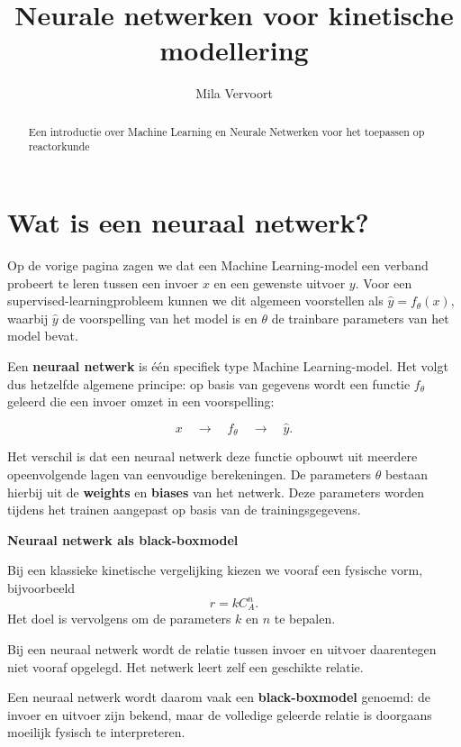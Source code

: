 \documentclass{ximera}
\title{Neurale netwerken voor kinetische modellering}
\author{Mila Vervoort}
\begin{document}
\begin{abstract}
    Een introductie over Machine Learning en Neurale Netwerken voor het toepassen op reactorkunde
\end{abstract}
\maketitle
\label{xim: Neurale Netwerken}

\section*{Wat is een neuraal netwerk?}

Op de vorige pagina zagen we dat een Machine Learning-model een verband probeert te leren tussen een invoer $x$ en een gewenste uitvoer $y$. Voor een supervised-learningprobleem kunnen we dit algemeen voorstellen als $\hat{y}=f_\theta(x),$ waarbij $\hat{y}$ de voorspelling van het model is en $\theta$ de trainbare parameters van het model bevat.

Een \textbf{neuraal netwerk} is één specifiek type Machine Learning-model.
Het volgt dus hetzelfde algemene principe: op basis van gegevens wordt een functie $f_\theta$ geleerd die een invoer omzet in een voorspelling:

\[
x
\quad\longrightarrow\quad
f_\theta
\quad\longrightarrow\quad
\hat{y}.
\]

Het verschil is dat een neuraal netwerk deze functie opbouwt uit meerdere opeenvolgende lagen van eenvoudige berekeningen. De parameters $\theta$ bestaan hierbij uit de \textbf{weights} en \textbf{biases} van het netwerk. Deze parameters worden tijdens het trainen aangepast op basis van de
trainingsgegevens. 


\begin{remark} \textbf{Neuraal netwerk als black-boxmodel}

Bij een klassieke kinetische vergelijking kiezen we vooraf een fysische vorm, bijvoorbeeld
\[
r=kC_A^n.
\]
Het doel is vervolgens om de parameters $k$ en $n$ te bepalen.

Bij een neuraal netwerk wordt de relatie tussen invoer en uitvoer daarentegen niet vooraf opgelegd. Het netwerk leert zelf een geschikte relatie.

Een neuraal netwerk wordt daarom vaak een \textbf{black-boxmodel} genoemd: de invoer en uitvoer zijn bekend, maar de volledige geleerde relatie is doorgaans moeilijk fysisch te interpreteren.
\end{remark}
\end{document}

